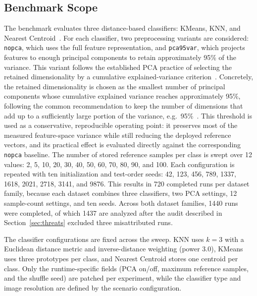 \documentclass[sigconf,review,nonacm]{acmart}
\begin{document}
\subsection{Benchmark Scope}
\label{sec:scope}
The benchmark evaluates three distance-based classifiers: KMeans, KNN, and Nearest Centroid~\cite{cover1967nearest,kanungo2002efficient,calafiore2019sparse}.
For each classifier, two preprocessing variants are considered: \texttt{nopca}, which uses the full feature representation, and \texttt{pca95var}, which projects features to enough principal components to retain approximately 95\% of the variance.
This variant follows the established PCA practice of selecting the retained dimensionality by a cumulative explained-variance criterion~\cite{geron2019handson}.
Concretely, the retained dimensionality is chosen as the smallest number of principal components whose cumulative explained variance reaches approximately 95\%, following the common recommendation to keep the number of dimensions that add up to a sufficiently large portion of the variance, e.g.\ 95\%~\cite{geron2019handson}.
This threshold is used as a conservative, reproducible operating point: it preserves most of the measured feature-space variance while still reducing the deployed reference vectors, and its practical effect is evaluated directly against the corresponding \texttt{nopca} baseline.
The number of stored reference samples per class is swept over 12 values: 2, 5, 10, 20, 30, 40, 50, 60, 70, 80, 90, and 100.
Each configuration is repeated with ten initialization and test-order seeds: 42, 123, 456, 789, 1337, 1618, 2021, 2718, 3141, and 9876.
This results in 720 completed runs per dataset family, because each dataset combines three classifiers, two PCA settings, 12 sample-count settings, and ten seeds. Across both dataset families, 1440 runs were completed, of which 1437 are analyzed after the audit described in Section~\ref{sec:threats} excluded three misattributed runs.

The classifier configurations are fixed across the sweep.
KNN uses $k=3$ with a Euclidean distance metric and inverse-distance weighting (power 3.0), KMeans uses three prototypes per class, and Nearest Centroid stores one centroid per class.
Only the runtime-specific fields (PCA on/off, maximum reference samples, and the shuffle seed) are patched per experiment, while the classifier type and image resolution are defined by the scenario configuration.
\end{document}

